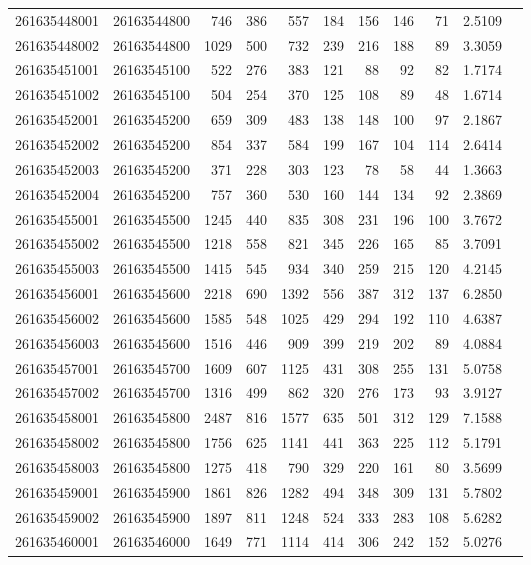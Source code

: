 \documentclass[11pt,landscape]{article}
\begin{document}
{\begin{longtable}[]{@{}lrrrrrrrrrr@{}}
261635448001 & 26163544800 & 746 & 386 & 557 & 184 & 156 & 146 & 71 & 2.5109 \\
261635448002 & 26163544800 & 1029 & 500 & 732 & 239 & 216 & 188 & 89 & 3.3059 \\
261635451001 & 26163545100 & 522 & 276 & 383 & 121 & 88 & 92 & 82 & 1.7174 \\
261635451002 & 26163545100 & 504 & 254 & 370 & 125 & 108 & 89 & 48 & 1.6714 \\
261635452001 & 26163545200 & 659 & 309 & 483 & 138 & 148 & 100 & 97 & 2.1867 \\
261635452002 & 26163545200 & 854 & 337 & 584 & 199 & 167 & 104 & 114 & 2.6414 \\
261635452003 & 26163545200 & 371 & 228 & 303 & 123 & 78 & 58 & 44 & 1.3663 \\
261635452004 & 26163545200 & 757 & 360 & 530 & 160 & 144 & 134 & 92 & 2.3869 \\
261635455001 & 26163545500 & 1245 & 440 & 835 & 308 & 231 & 196 & 100 & 3.7672 \\
261635455002 & 26163545500 & 1218 & 558 & 821 & 345 & 226 & 165 & 85 & 3.7091 \\
261635455003 & 26163545500 & 1415 & 545 & 934 & 340 & 259 & 215 & 120 & 4.2145 \\
261635456001 & 26163545600 & 2218 & 690 & 1392 & 556 & 387 & 312 & 137 & 6.2850 \\
261635456002 & 26163545600 & 1585 & 548 & 1025 & 429 & 294 & 192 & 110 & 4.6387 \\
261635456003 & 26163545600 & 1516 & 446 & 909 & 399 & 219 & 202 & 89 & 4.0884 \\
261635457001 & 26163545700 & 1609 & 607 & 1125 & 431 & 308 & 255 & 131 & 5.0758 \\
261635457002 & 26163545700 & 1316 & 499 & 862 & 320 & 276 & 173 & 93 & 3.9127 \\
261635458001 & 26163545800 & 2487 & 816 & 1577 & 635 & 501 & 312 & 129 & 7.1588 \\
261635458002 & 26163545800 & 1756 & 625 & 1141 & 441 & 363 & 225 & 112 & 5.1791 \\
261635458003 & 26163545800 & 1275 & 418 & 790 & 329 & 220 & 161 & 80 & 3.5699 \\
261635459001 & 26163545900 & 1861 & 826 & 1282 & 494 & 348 & 309 & 131 & 5.7802 \\
261635459002 & 26163545900 & 1897 & 811 & 1248 & 524 & 333 & 283 & 108 & 5.6282 \\
261635460001 & 26163546000 & 1649 & 771 & 1114 & 414 & 306 & 242 & 152 & 5.0276 \\

\end{longtable}}
\end{document}

